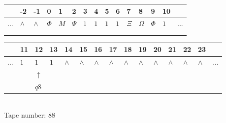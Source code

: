 \documentclass[11pt]{article}
\begin{document}
\begin{table}[H]
\centering
\begin{tabular}{lllllllllllllll}
 & -2 & -1 & 0 & 1 & 2 & 3 & 4 & 5 & 6 & 7 & 8 & 9 & 10 & \\
\hline
$...$ & \multicolumn{1}{|l|}{$\wedge$} & \multicolumn{1}{|l|}{$\wedge$} & \multicolumn{1}{|l|}{$\Phi$} & \multicolumn{1}{|l|}{$M$} & \multicolumn{1}{|l|}{$\Psi$} & \multicolumn{1}{|l|}{$1$} & \multicolumn{1}{|l|}{$1$} & \multicolumn{1}{|l|}{$1$} & \multicolumn{1}{|l|}{$1$} & \multicolumn{1}{|l|}{$\Xi$} & \multicolumn{1}{|l|}{$\Omega$} & \multicolumn{1}{|l|}{$\Phi$} & \multicolumn{1}{|l|}{$1$} & $...$\\
\hline
&  &  &  &  &  &  &  &  &  &  &  &  &  &  \\
&  &  &  &  &  &  &  &  &  &  &  &  &  &  \\
\end{tabular}
\begin{tabular}{lllllllllllllll}
 & 11 & 12 & 13 & 14 & 15 & 16 & 17 & 18 & 19 & 20 & 21 & 22 & 23 & \\
\hline
$...$ & \multicolumn{1}{|l|}{$1$} & \multicolumn{1}{|l|}{$1$} & \multicolumn{1}{|l|}{$1$} & \multicolumn{1}{|l|}{$\wedge$} & \multicolumn{1}{|l|}{$\wedge$} & \multicolumn{1}{|l|}{$\wedge$} & \multicolumn{1}{|l|}{$\wedge$} & \multicolumn{1}{|l|}{$\wedge$} & \multicolumn{1}{|l|}{$\wedge$} & \multicolumn{1}{|l|}{$\wedge$} & \multicolumn{1}{|l|}{$\wedge$} & \multicolumn{1}{|l|}{$\wedge$} & \multicolumn{1}{|l|}{$\wedge$} & $...$\\
\hline
&  & $\uparrow$ &  &  &  &  &  &  &  &  &  &  &  &  \\
&  & $ q8 $ &  &  &  &  &  &  &  &  &  &  &  &  \\
\end{tabular}
\\
Tape number: 88
\noindent\makebox[\linewidth]{\hdashrule{\textwidth}{1pt}{1pt}}\end{table}
\end{document}
